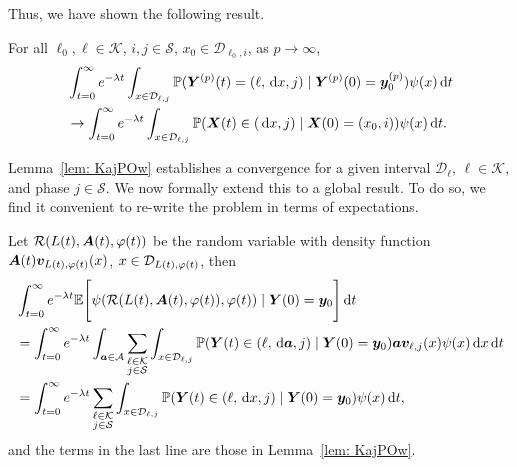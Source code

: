 Thus, we have shown the following result.
\begin{lem}\label{lem: KajPOw}
	For all \(\ell_0,\ell\in\mathcal K\), \(i,j\in\mathcal S\), \(x_0\in\mathcal D_{\ell_0,i}\), as \(p\to\infty\), 
	\begin{align}
		&\int_{t=0}^\infty e^{-\lambda t}\int_{x\in\mathcal D_{\ell,j}}\mathbb P( {\boldsymbol Y}^{(p)}(t) = (\ell,\, \mathrm{d} x,j) \mid \boldsymbol Y^{(p)}(0)=\boldsymbol y_0^{(p)})  \psi(x)\, \mathrm{d} t \nonumber
		\\&\to \int_{t=0}^\infty e^{-\lambda t}  \int_{x\in\mathcal{D}_{\ell,j}} \mathbb P(\boldsymbol X(t)\in(\, \mathrm{d} x, j)  
		\mid \boldsymbol X(0)=(x_0, i))\psi(x)\, \mathrm{d} t. \nonumber
	\end{align}
\end{lem}

Lemma~\ref{lem: KajPOw} establishes a convergence for a given interval \(\mathcal D_\ell,\, \ell\in\mathcal K\), and phase \(j\in\mathcal S\). We now formally extend this to a global result. To do so, we find it convenient to re-write the problem in terms of expectations. 
 
Let \(\mathcal R(L(t),\boldsymbol A(t),\varphi(t))\) be the random variable with density function \(\boldsymbol A(t)\boldsymbol v_{L(t),\varphi(t)}(x)\), \(x\in\mathcal{D}_{L(t),\varphi(t)}\), then
\begin{align}
	&\int_{t=0}^\infty e^{-\lambda t}\mathbb E\Bigg[\psi(\mathcal R(L(t),\boldsymbol A(t),\varphi(t)),\varphi(t) )  \mid \nonumber
	\boldsymbol Y (0)=\boldsymbol y_0 \Bigg] \, \mathrm{d} t 
	\\&=\int_{t=0}^\infty e^{-\lambda t}\int_{\boldsymbol a\in\mathcal A}\sum_{\substack{\ell\in\mathcal K\\j\in\mathcal{S}}}\int_{x\in\mathcal{D}_{\ell,j}}\mathbb P( {\boldsymbol Y}(t) \in (\ell,\, \mathrm{d} \boldsymbol a,j) \mid \boldsymbol Y(0)=\boldsymbol y_0)\boldsymbol a\boldsymbol v_{\ell,j}(x)  \psi(x)\, \mathrm{d} x\, \mathrm{d} t \nonumber 
	\\&=\int_{t=0}^\infty e^{-\lambda t}\sum_{\substack{\ell\in\mathcal K\\j\in\mathcal{S}}}\int_{x\in\mathcal D_{\ell,j}}\mathbb P( {\boldsymbol Y} (t) \in (\ell,\, \mathrm{d} x,j) \mid \boldsymbol Y (0)=\boldsymbol y_0 )  \psi(x)\, \mathrm{d} t,
\end{align}
and the terms in the last line are those in Lemma~\ref{lem: KajPOw}. 

